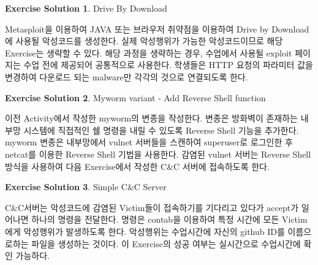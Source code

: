 \documentclass[a4paper, 11pt]{article}
\theoremstyle{definition}
\newtheorem{exercise solution}{Exercise Solution}
\begin{document}
\begin{exercise solution}
	Drive By Download
	
	Metasploit\cite{metasploit}을 이용하여 JAVA 또는 브라우저 취약점을 이용하여 Drive by Download에 사용될 악성코드를 생성한다. 실제 악성행위가 가능한 악성코드이므로 해당 Exercise는 생략할 수 있다. 해당 과정을 생략하는 경우, 수업에서 사용될 exploit 페이지는 수업 전에 제공되어 공통적으로 사용한다. 학생들은 HTTP 요청의 파라미터 값을 변경하여 다운로드 되는 malware만 각각의 것으로 연결되도록 한다.
\end{exercise solution}


\begin{exercise solution}
	Myworm variant - Add Reverse Shell function
	
	이전 Activity에서 작성한 myworm의 변종을 작성한다. 변종은 방화벽이 존재하는 내부망 시스템에 직접적인 쉘 명령을 내릴 수 있도록 Reverse Shell 기능을 추가한다. myworm 변종은 내부망에서 vulnet 서버들을 스캔하여 superuser로 로그인한 후 netcat\cite{netcat}를 이용한 Reverse Shell 기법을 사용한다. 감염된 vulnet 서버는 Reverse Shell 방식을 사용하여 다음 Exercise에서 작성한 C\&C 서버에 접속하도록 한다.
	
\end{exercise solution}


\begin{exercise solution}
	Simple C\&C Server
	
	C\&C서버는 악성코드에 감염된 Victim들이 접속하기를 기다리고 있다가 accept가 일어나면 하나의 명령을 전달한다. 명령은 contab\cite{cron}을 이용하여 특정 시간에 모든 Victim에게 악성행위가 발생하도록 한다. 악성행위는 수업시간에 자신의 github ID를 이름으로하는 파일을 생성하는 것이다. 이 Exercise의 성공 여부는 실시간으로 수업시간에 확인 가능하다.
	
\end{exercise solution}







\end{document}
